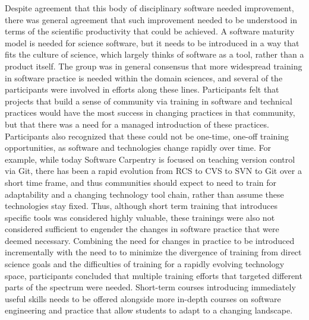 \documentclass[11pt, oneside]{amsart}
\begin{document}
Despite agreement that this body of disciplinary software needed improvement,
there was general agreement that such improvement needed to be understood in
terms of the scientific productivity that could be achieved. A software maturity
model is needed for science software, but it needs to be introduced in a way
that fits the culture of science, which largely thinks of software as a tool,
rather than a product itself. The group was in general consensus that more
widespread training in software practice is needed within the domain sciences,
and several of the participants were involved in efforts along these lines.
Participants felt that projects that build a sense of community via training in
software and technical practices would have the most success in changing
practices in that community, but that there was a need for a managed
introduction of these practices. Participants also recognized that these could
not be one-time, one-off training opportunities, as software and technologies
change rapidly over time. For example, while today Software Carpentry is focused
on teaching version control via Git, there has been a rapid evolution from RCS
to CVS to SVN to Git over a short time frame, and thus communities should expect
to need to train for adaptability and a changing technology tool chain, rather
than assume these technologies stay fixed. Thus, although short term training
that introduces specific tools was considered highly valuable, these trainings
were also not considered sufficient to engender the changes in software practice
that were deemed necessary. Combining the need for changes in practice to be
introduced incrementally with the need to to minimize the divergence of training
from direct science goals and the difficulties of training for a rapidly
evolving technology space, participants concluded that multiple training efforts
that targeted different parts of the spectrum were needed. Short-term courses
introducing immediately useful skills needs to be offered alongside more
in-depth courses on software engineering and practice that allow students to
adapt to a changing landscape.
\end{document}
